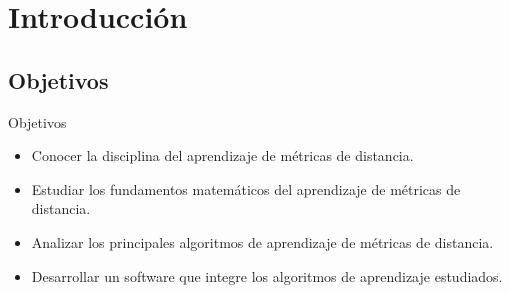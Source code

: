 \documentclass[10pt, compress]{beamer}
\begin{document}
	

{
	\begin{frame}[plain]
		\titlepage
	\end{frame}
}





\section{Introducción}

\subsection{Objetivos}

\begin{frame}{Objetivos}

\begin{itemize}

  \item Conocer la disciplina del aprendizaje de métricas de distancia.

  \item Estudiar los fundamentos matemáticos del aprendizaje de métricas de distancia.

  \item Analizar los principales algoritmos de aprendizaje de métricas de distancia.

  \item Desarrollar un software que integre los algoritmos de aprendizaje estudiados. 

\end{itemize}

\end{frame}
\end{document}
